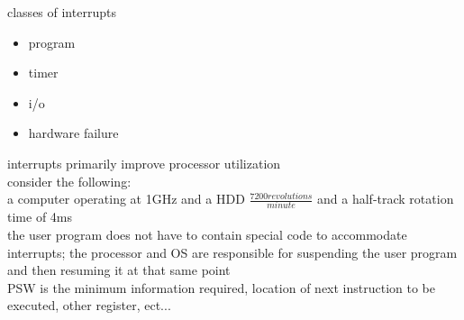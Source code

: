 \documentclass{article}
\begin{document}
classes of interrupts
	\begin{itemize}
		\item program
		\item timer
		\item i/o
		\item hardware failure
	\end{itemize}

interrupts primarily improve processor utilization\\
consider the following:\\
a computer operating at 1GHz and a HDD $\frac{7200revolutions}{minute}$ and a half-track rotation time of 4ms\\

the user program does not have to contain special code to accommodate interrupts; the processor and OS are responsible for suspending the user program and then resuming it at that same point\\

PSW is the minimum information required, location of next instruction to be executed, other register, ect...\\
\end{document}
